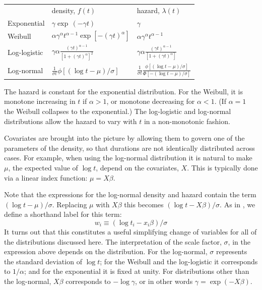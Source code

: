 \begin{center}
\setlength\tabcolsep{1.5em}
\begin{tabular}{lll}
 & density, $f(t)$ & hazard, $\lambda(t)$ \\ [1ex]
Exponential & $\displaystyle 
\gamma \exp\,(-\gamma t)$ &$\displaystyle
\gamma$ \\ [1ex]
Weibull & $\displaystyle
\alpha\gamma^{\alpha}t^{\alpha-1}\exp\left[-(\gamma t)^\alpha\right]$ 
& $\displaystyle \alpha\gamma^{\alpha}t^{\alpha-1}$ \\ [1ex]
Log-logistic & $\displaystyle \gamma\alpha
\frac{(\gamma t)^{\alpha-1}}
{\left[1 + (\gamma t)^\alpha\right]^2}$ 
& $\displaystyle \gamma\alpha
\frac{(\gamma t)^{\alpha-1}}
{\left[1 + (\gamma t)^\alpha\right]}$ \\ [2.5ex]
Log-normal & $\displaystyle
\frac{1}{\sigma t} \phi\left[(\log t - \mu)/\sigma \right]$ 
& $\displaystyle
\frac{1}{\sigma t} \frac{\phi\left[(\log t - \mu)/\sigma \right]}
{\Phi\left[-(\log t - \mu)/\sigma \right]}$
\end{tabular}
\end{center}

The hazard is constant for the exponential distribution.  For the
Weibull, it is monotone increasing in $t$ if $\alpha > 1$, or
monotone decreasing for $\alpha < 1$. (If $\alpha = 1$ the Weibull
collapses to the exponential.)  The log-logistic and log-normal
distributions allow the hazard to vary with $t$ in a non-monotonic
fashion.

Covariates are brought into the picture by allowing them to govern one
of the parameters of the density, so that durations are not
identically distributed across cases.  For example, when using the
log-normal distribution it is natural to make $\mu$, the expected
value of $\log t$, depend on the covariates, $X$.  This is typically
done via a linear index function: $\mu = X\beta$.

Note that the expressions for the log-normal density and hazard
contain the term $(\log t - \mu)/\sigma$.  Replacing $\mu$ with
$X\beta$ this becomes $(\log t - X\beta)/\sigma$.  As in
\cite{kalbfleisch02}, we define a shorthand label for this
term:
\begin{equation}
\label{eq:duration-w}
w_i \equiv (\log t_i - x_i\beta)/\sigma
\end{equation}
It turns out that this constitutes a useful simplifying change of
variables for all of the distributions discussed here.  The
interpretation of the scale factor, $\sigma$, in the expression above
depends on the distribution. For the log-normal, $\sigma$ represents
the standard deviation of $\log t$; for the Weibull and the
log-logistic it corresponds to $1/\alpha$; and for the exponential it
is fixed at unity. For distributions other than the log-normal,
$X\beta$ corresponds to $-\log \gamma$, or in other words
$\gamma = \exp(-X\beta)$.

